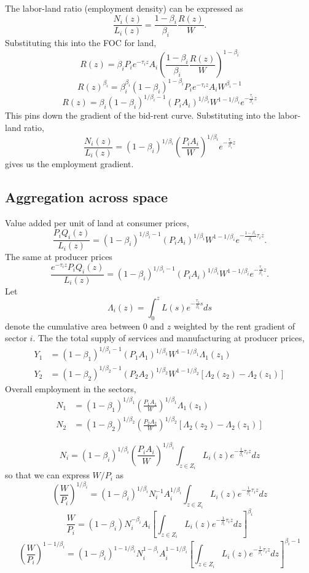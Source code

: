 \documentclass[12pt]{article}
\begin{document}
The labor-land ratio (employment density) can be expressed as
\[
\frac{N_i(z)}{L_i(z)} = \frac{1-\beta_i}{\beta_i}\frac{R(z)}{W}.
\]
Substituting this into the FOC for land,
\[
R(z) =\beta_i P_ie^{-\tau_i z}A_i \left(\frac{1-\beta_i}{\beta_i}\frac{R(z)}{W}\right)^{1-\beta_i}
\]
\[
R(z)^{\beta_i} =\beta_i^{\beta_i}(1-\beta_i)^{1-\beta_i} P_ie^{-\tau_i z}A_i W^{\beta_i-1}
\]
\[
R(z) =\beta_i(1-\beta_i)^{1/\beta_i-1} (P_iA_i)^{1/\beta_i} W^{1-1/\beta_i} e^{-\frac{\tau_i}{\beta_i} z}
\]
This pins down the gradient of the bid-rent curve. Substituting into the labor-land ratio,
\[
\frac{N_i(z)}{L_i(z)} = (1-\beta_i)^{1/\beta_i} \left(\frac{P_iA_i}{W}\right)^{1/\beta_i} e^{-\frac{\tau_i}{\beta_i} z}
\]
gives us the employment gradient.

\subsection{Aggregation across space}
Value added per unit of land at consumer prices,
\[
\frac{P_i Q_i(z)}{L_i(z)} = (1-\beta_i)^{1/\beta_i-1}
(P_iA_i)^{1/\beta_i}W^{1-1/\beta_i}
 e^{-\frac{1-\beta_i}{\beta_i}\tau_i z}.
\]
The same at producer prices
\[
\frac{e^{-\tau_i z} P_i Q_i(z)}{L_i(z)} = (1-\beta_i)^{1/\beta_i-1}
(P_iA_i)^{1/\beta_i}W^{1-1/\beta_i}
 e^{-\frac{\tau_i}{\beta_i} z}.
\]
Let 
\[
\Lambda_i(z) = \int_0^z L(s)e^{-\frac{\tau_i}{\beta_i} s}ds
\]
denote the cumulative area between $0$ and $z$ weighted by the rent gradient of sector $i$. The the total supply of services and manufacturing at producer prices,
\begin{align*}
Y_1 &= (1-\beta_1)^{1/\beta_1-1}
(P_1A_1)^{1/\beta_1}W^{1-1/\beta_1} \Lambda_1(z_1)\\
Y_2 &= (1-\beta_2)^{1/\beta_2-1}
(P_2A_2)^{1/\beta_2}W^{1-1/\beta_2} [\Lambda_2(z_2)-\Lambda_2(z_1)]
\end{align*}
Overall employment in the sectors,
\begin{align*}
N_1 &= (1-\beta_1)^{1/\beta_1}
\left(\frac{P_1A_1}{W}\right)^{1/\beta_1} \Lambda_1(z_1)\\
N_2 &= (1-\beta_2)^{1/\beta_2}
\left(\frac{P_2A_2}{W}\right)^{1/\beta_2}  [\Lambda_2(z_2)-\Lambda_2(z_1)]
\end{align*}

\[
N_i = (1-\beta_i)^{1/\beta_i}
\left(\frac{P_iA_i}{W}\right)^{1/\beta_i}
\int_{z\in Z_i}L_i(z) e^{-\frac{1}{\beta_i}\tau_i z}dz
\]
so that we can express $W/P_i$ as
\[
\left(\frac{W}{P_i}\right)^{1/\beta_i} = (1-\beta_i)^{1/\beta_i}
N_i^{-1}A_i^{1/\beta_i}
\int_{z\in Z_i}L_i(z) e^{-\frac{1}{\beta_i}\tau_i z}dz
\]
\[
\frac{W}{P_i} = (1-\beta_i)
N_i^{-\beta_i}A_i
\left[\int_{z\in Z_i}L_i(z) e^{-\frac{1}{\beta_i}\tau_i z}dz\right]^{\beta_i}
\]
\[
\left(\frac{W}{P_i}\right)^{1-1/\beta_i} = (1-\beta_i)^{1-1/\beta_i}
N_i^{1-\beta_i}A_i^{1-1/\beta_i}
\left[\int_{z\in Z_i}L_i(z) e^{-\frac{1}{\beta_i}\tau_i z}dz\right]^{\beta_i-1}
\]
\end{document}
